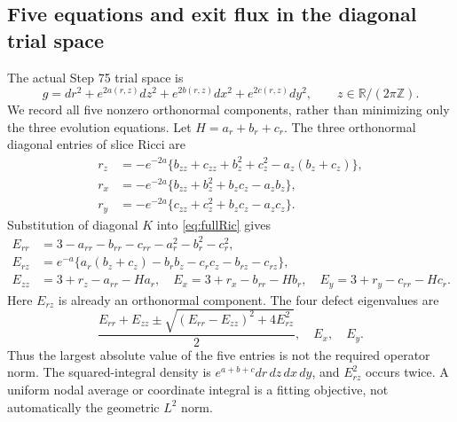 \documentclass[a4paper,11pt]{article}
\numberwithin{equation}{section}
\theoremstyle{definition}
\begin{document}
\subsection{Five equations and exit flux in the diagonal trial space}\label{sec:diagonal-core}
The actual Step 75 trial space is
\begin{equation}\label{eq:diagonal-core-metric}
 g=dr^2+e^{2a(r,z)}dz^2+e^{2b(r,z)}dx^2+e^{2c(r,z)}dy^2,
 \qquad z\in\mathbb R/(2\pi\mathbb Z).
\end{equation}
We record all five nonzero orthonormal components, rather than minimizing only the three evolution equations.
Let $H=a_r+b_r+c_r$. The three orthonormal diagonal entries of slice Ricci are
\begin{align*}
 r_z&=-e^{-2a}\{b_{zz}+c_{zz}+b_z^2+c_z^2-a_z(b_z+c_z)\},\\
 r_x&=-e^{-2a}\{b_{zz}+b_z^2+b_zc_z-a_zb_z\},\\
 r_y&=-e^{-2a}\{c_{zz}+c_z^2+b_zc_z-a_zc_z\}.
\end{align*}
Substitution of diagonal $K$ into \eqref{eq:fullRic} gives
\begin{align}
 E_{rr}&=3-a_{rr}-b_{rr}-c_{rr}-a_r^2-b_r^2-c_r^2,\nonumber\\
 E_{rz}&=e^{-a}\{a_r(b_z+c_z)-b_rb_z-c_rc_z-b_{rz}-c_{rz}\},\nonumber\\
 E_{zz}&=3+r_z-a_{rr}-Ha_r,\quad
 E_x=3+r_x-b_{rr}-Hb_r,\quad
 E_y=3+r_y-c_{rr}-Hc_r.\label{eq:diagonal-five}
\end{align}
Here $E_{rz}$ is already an orthonormal component. The four defect eigenvalues are
\[
 \frac{E_{rr}+E_{zz}\pm\sqrt{(E_{rr}-E_{zz})^2+4E_{rz}^2}}2,\quad E_x,\quad E_y.
\]
Thus the largest absolute value of the five entries is not the required operator norm.
The squared-integral density is $e^{a+b+c}dr\,dz\,dx\,dy$, and $E_{rz}^2$ occurs twice.
A uniform nodal average or coordinate integral is a fitting objective, not automatically the geometric $L^2$ norm.
\end{document}
